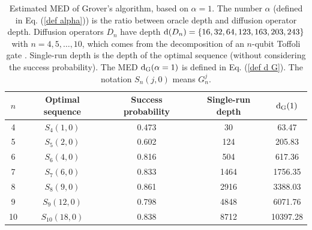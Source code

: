 \documentclass[%
 twocolumn,
 10pt,
 superscriptaddress,
 longbibliography,
 amsmath,amssymb,
 aps,
 pra,
floatfix,
]{revtex4-1}
\begin{document}
\begin{table}[h]
	\begin{ruledtabular}
	\caption{\label{Table 1}  Estimated MED of Grover's algorithm, based on $\alpha=1$. The number $\alpha$ (defined in Eq. (\ref{def alpha})) is the ratio between oracle depth and diffusion operator depth. Diffusion operators $D_n$ have depth $\text d(D_n)=\{16,32,64,123,163,203,243\}$ with $n=4,5,\ldots,10$, which comes from the decomposition of an $n$-qubit Toffoli gate \cite{BBCDMSSSW95}. Single-run depth is the depth of the optimal sequence (without considering the success probability). The MED $\text d_\text{G}(\alpha=1)$ is defined in Eq. (\ref{def d G}). The notation $S_n(j,0)$ means $G^j_n$.}
	
	
		\begin{tabular}{ccccc}
			
			$n$ & Optimal sequence & Success probability &  Single-run depth & $\text d_\text{G}(1)$  \\ \hline
			
			4 & $S_4(1,0)$ & 0.473 & 30 & 63.47  \\
			
			5 & $S_5(2,0)$ & 0.602 & 124 & 205.83 \\
			
			6 & $S_6(4,0)$ & 0.816 & 504 & 617.36 \\
			
			7 & $S_7(6,0)$ & 0.833 & 1464 & 1756.35 \\
			
			8 & $S_8(9,0)$ & 0.861 & 2916 & 3388.03 \\
			
			9 & $S_9(12,0)$ & 0.798 & 4848 & 6071.76 \\
			
			10 & $S_{10}(18,0)$ & 0.838 & 8712 & 10397.28 \\
			
		\end{tabular}
    \end{ruledtabular} 
    
\end{table}
\end{document}
